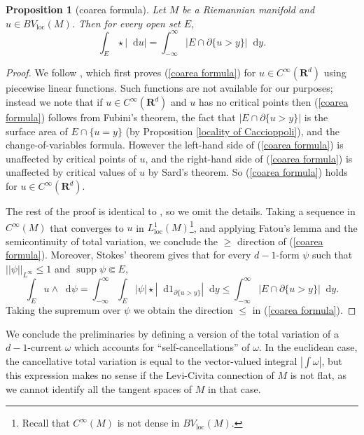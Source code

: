 \documentclass[reqno,12pt,letterpaper]{amsart}
\newcommand{\RR}{\mathbf{R}}
\DeclareMathOperator{\supp}{supp}
\newcommand*\dif{\mathop{}\!\mathrm{d}}
\newcommand{\loc}{\mathrm{loc}}
\newtheorem{proposition}[theorem]{Proposition}
\theoremstyle{definition}
\numberwithin{equation}{section}
\begin{document}
\begin{proposition}[coarea formula]\label{Coarea2}
Let $M$ be a Riemannian manifold and $u \in BV_\loc(M)$. Then for every open set $E$,
\begin{equation}\label{coarea formula}
\int_E \star |\dif u| = \int_{-\infty}^\infty |E \cap \partial \{u > y\}| \dif y.
\end{equation}
\end{proposition}
\begin{proof}
We follow \cite[Theorem 1.23]{Giusti77}, which first proves (\ref{coarea formula}) for $u \in C^\infty(\RR^d)$ using piecewise linear functions.
Such functions are not available for our purposes; instead we note that if $u \in C^\infty(\RR^d)$ and $u$ has no critical points then (\ref{coarea formula}) follows from Fubini's theorem, the fact that $|E \cap \partial \{u > y\}|$ is the surface area of $E \cap \{u = y\}$ (by Proposition \ref{locality of Caccioppoli}), and the change-of-variables formula.
However the left-hand side of (\ref{coarea formula}) is unaffected by critical points of $u$, and the right-hand side of (\ref{coarea formula}) is unaffected by critical values of $u$ by Sard's theorem.
So (\ref{coarea formula}) holds for $u \in C^\infty(\RR^d)$.

The rest of the proof is identical to \cite[Theorem 1.23]{Giusti77}, so we omit the details.
Taking a sequence in $C^\infty(M)$ that converges to $u$ in $L^1_\loc(M)$\footnote{Recall that $C^\infty(M)$ is not dense in $BV_\loc(M)$.}, and applying Fatou's lemma and the semicontinuity of total variation, we conclude the $\geq$ direction of (\ref{coarea formula}).
Moreover, Stokes' theorem gives that for every $d-1$-form $\psi$ such that $||\psi||_{L^\infty} \leq 1$ and $\supp \psi \Subset E$,
$$\int_E u \wedge \dif \psi = \int_{-\infty}^\infty \int_E |\psi| \star |\dif 1_{\partial \{u > y\}}| \dif y \leq \int_{-\infty}^\infty |E \cap \partial \{u > y\}| \dif y.$$
Taking the supremum over $\psi$ we obtain the direction $\leq$ in (\ref{coarea formula}).
\end{proof}

We conclude the preliminaries by defining a version of the total variation of a $d-1$-current $\omega$ which accounts for ``self-cancellations'' of $\omega$.
In the euclidean case, the cancellative total variation is equal to the vector-valued integral $|\int \omega|$, but this expression makes no sense if the Levi-Civita connection of $M$ is not flat, as we cannot identify all the tangent spaces of $M$ in that case.
\end{document}
